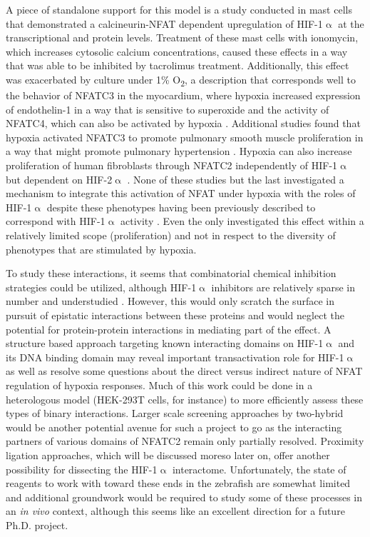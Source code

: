 A piece of standalone support for this model is a study conducted in mast cells that demonstrated a calcineurin-NFAT dependent upregulation of HIF-1$\upalpha$ at the transcriptional and protein levels. Treatment of these mast cells with ionomycin, which increases cytosolic calcium concentrations, caused these effects in a way that was able to be inhibited by tacrolimus treatment. Additionally, this effect was exacerbated by culture under 1\% O\textsubscript{2}, a description that corresponds well to the behavior of NFATC3 in the myocardium, where hypoxia increased expression of endothelin-1 in a way that is sensitive to superoxide and the activity of NFATC4, which can also be activated by hypoxia \citep{deFrutos2011, RamiroDiaz2014, Moreno2015}. Additional studies found that hypoxia activated NFATC3 to promote pulmonary smooth muscle proliferation in a way that might promote pulmonary hypertension \citep{Hou2013}. Hypoxia can also increase proliferation of human fibroblasts through NFATC2 independently of HIF-1$\upalpha$ but dependent on HIF-2$\upalpha$ \citep{Senavirathani2018}. None of these studies but the last investigated a mechanism to integrate this activation of NFAT under hypoxia with the roles of HIF-1$\upalpha$ despite these phenotypes having been previously described to correspond with HIF-1$\upalpha$ activity \citep{Cui2021, Qi2017, Li2014, Thackaberry2002, SonanezOrganis2016}. Even the \citeauthor{Senavirathani2018} only investigated this effect within a relatively limited scope (proliferation) and not in respect to the diversity of phenotypes that are stimulated by hypoxia.

To study these interactions, it seems that combinatorial chemical inhibition strategies could be utilized, although HIF-1$\upalpha$ inhibitors are relatively sparse in number and understudied \citep{Viziteu2016}. However, this would only scratch the surface in pursuit of epistatic interactions between these proteins and would neglect the potential for protein-protein interactions in mediating part of the effect. A structure based approach targeting known interacting domains on HIF-1$\upalpha$ and its DNA binding domain may reveal important transactivation role for HIF-1$\upalpha$ as well as resolve some questions about the direct versus indirect nature of NFAT regulation of hypoxia responses. Much of this work could be done in a heterologous model (HEK-293T cells, for instance) to more efficiently assess these types of binary interactions. Larger scale screening approaches by two-hybrid would be another potential avenue for such a project to go as the interacting partners of various domains of NFATC2 remain only partially resolved. Proximity ligation approaches, which will be discussed moreso later on, offer another possibility for dissecting the HIF-1$\upalpha$ interactome. Unfortunately, the state of reagents to work with toward these ends in the zebrafish are somewhat limited and additional groundwork would be required to study some of these processes in an \textit{in vivo} context, although this seems like an excellent direction for a future Ph.D. project.

